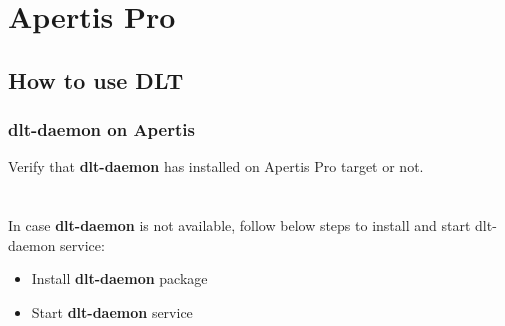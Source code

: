%
%
%
\chapter{Apertis Pro}
\section{How to use DLT}

\subsection{dlt-daemon on Apertis}
Verify that \textbf{dlt-daemon} has installed on Apertis Pro target or not.\\
\\
\\
In case \textbf{dlt-daemon} is not available, follow below steps to install and
start dlt-daemon service:
\begin{itemize}
   \item Install \textbf{dlt-daemon} package\\
   \item Start \textbf{dlt-daemon} service\\
\end{itemize}

